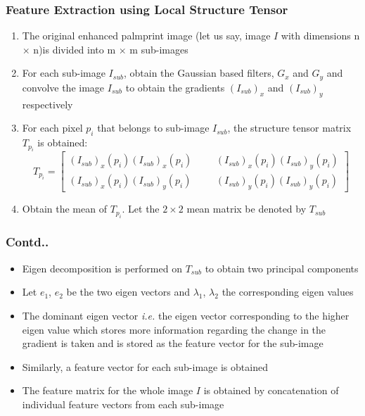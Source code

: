 \documentclass{beamer}
\begin{document}
 
\begin{frame}
 \frametitle{Feature Extraction using Local Structure Tensor}
  \begin{enumerate}
    \item The original enhanced palmprint image (let us say, image $I$ with dimensions n $\times$ n)is divided into m $\times$ m sub-images
  \item For each sub-image $I_{sub}$, obtain the Gaussian based filters,
$G_x$ and $G_y$ and convolve the image $I_{sub}$ to obtain the gradients $(I_{sub})_{x}$ and $(I_{sub})_{y}$ respectively 
  \item For each pixel $p_i$ that belongs to sub-image $I_{sub}$, the structure tensor matrix $T_{p_{i}}$ is obtained:
\begin{equation}
 T_{p_{i}} = \begin{bmatrix} (I_{sub})_x(p_i) (I_{sub})_x(p_i) & & & (I_{sub})_x(p_i) (I_{sub})_y(p_i) \\ (I_{sub})_x(p_i) (I_{sub})_y(p_i) & & & (I_{sub})_y(p_i) (I_{sub})_y(p_i) \end{bmatrix}
\end{equation}
  \item Obtain the mean of $T_{p_{i}}$. Let the $2 \times 2$ mean matrix be denoted by $T_{sub}$
  \end{enumerate}
 \end{frame}
 

\begin{frame}
	\frametitle{Contd..}
		\begin{itemize}
 			\item Eigen decomposition is performed on $T_{sub}$ to obtain two principal components 
 			\item Let $e_1$, $e_2$ be the two eigen vectors and $\lambda_1$, $\lambda_2$ the corresponding eigen values 
 			\item The dominant eigen vector \emph{i.e.} the eigen vector corresponding to the higher eigen value which stores more information regarding the change in the gradient is taken and is stored as the feature vector for the sub-image 
 			\item Similarly, a feature vector for each sub-image is obtained 
 			\item The feature matrix for the whole image $I$ is obtained by concatenation of individual feature vectors from each sub-image
		\end{itemize} 
\end{frame}
\end{document}
